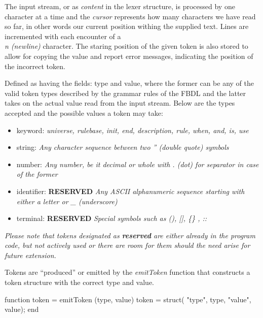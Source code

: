 The input stream, or as \textit{content} in the lexer structure, is processed by one character at a time and the \textit{cursor} represents how many characters we have read so far, in other words our current position withing the supplied text. Lines are incremented with each encounter of a \textit{\\n (newline)} character. The staring position of the given token is also stored to allow for copying the value and report error messages, indicating the position of the incorrect token.

Defined as having the fields: type and value, where the former can be any of the valid token types described by the grammar rules of the FBDL and the latter takes on the actual value read from the input stream. Below are the types accepted and the possible values a token may take:

\begin{itemize}
	\item keyword: \textit{universe, rulebase, init, end, description, rule, when, and, is, use}
	\item string: \textit{Any character sequence between two '' (double quote) symbols}
	\item number: \textit{Any number, be it decimal or whole with . (dot) for separator in case of the former}
	\item identifier: \textbf{RESERVED} \textit{Any ASCII alphanumeric sequence starting with either a letter or \_ (underscore)}
	\item terminal: \textbf{RESERVED} \textit{Special symbols such as (), [], \{\} , ::}
\end{itemize}

\textit{Please note that tokens designated as \textbf{reserved} are either already in the program code, but not actively used or there are room for them should the need arise for future extension.}

Tokens are ``produced'' or emitted by the \textit{emitToken}  function that constructs a token structure with the correct type and value.

\begin{octave}
function token = emitToken (type, value)
  token = struct(
  "type", type,
  "value", value);
end
\end{octave}

